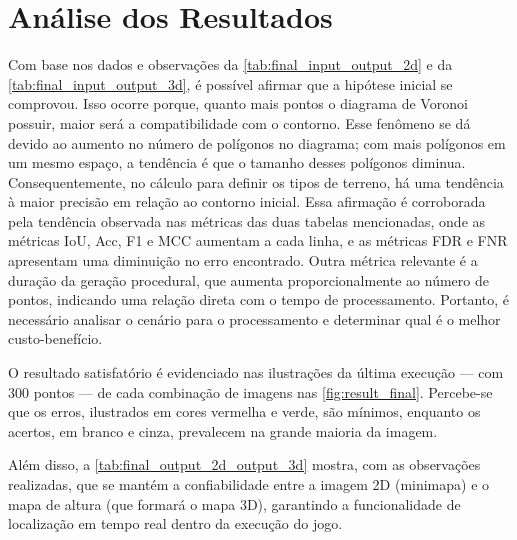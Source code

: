 \section{Análise dos Resultados}

Com base nos dados e observações da \cref{tab:final_input_output_2d} e da \cref{tab:final_input_output_3d}, é possível afirmar que a hipótese inicial se comprovou. Isso ocorre porque, quanto mais pontos o diagrama de Voronoi possuir, maior será a compatibilidade com o contorno. Esse fenômeno se dá devido ao aumento no número de polígonos no diagrama; com mais polígonos em um mesmo espaço, a tendência é que o tamanho desses polígonos diminua. Consequentemente, no cálculo para definir os tipos de terreno, há uma tendência à maior precisão em relação ao contorno inicial. Essa afirmação é corroborada pela tendência observada nas métricas das duas tabelas mencionadas, onde as métricas IoU, Acc, F1 e MCC aumentam a cada linha, e as métricas FDR e FNR apresentam uma diminuição no erro encontrado. Outra métrica relevante é a duração da geração procedural, que aumenta proporcionalmente ao número de pontos, indicando uma relação direta com o tempo de processamento. Portanto, é necessário analisar o cenário para o processamento e determinar qual é o melhor custo-benefício.

O resultado satisfatório é evidenciado nas ilustrações da última execução — com 300 pontos — de cada combinação de imagens nas \cref{fig:result_final}. Percebe-se que os erros, ilustrados em cores vermelha e verde, são mínimos, enquanto os acertos, em branco e cinza, prevalecem na grande maioria da imagem.

Além disso, a \cref{tab:final_output_2d_output_3d} mostra, com as observações realizadas, que se mantém a confiabilidade entre a imagem 2D (minimapa) e o mapa de altura (que formará o mapa 3D), garantindo a funcionalidade de localização em tempo real dentro da execução do jogo.


